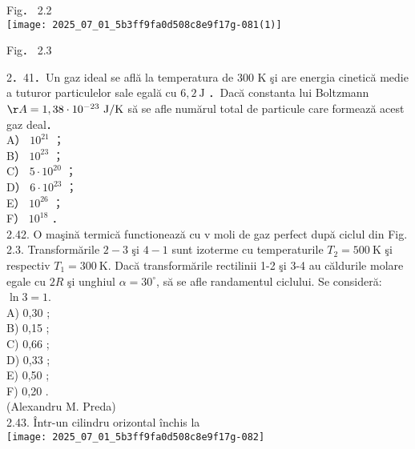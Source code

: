 Fig． 2.2\\
\texttt{[image: 2025\_07\_01\_5b3ff9fa0d508c8e9f17g-081(1)]}

Fig． 2.3

2．41．Un gaz ideal se află la temperatura de 300 K şi are energia cinetică medie a tuturor particulelor sale egală cu $6,2 \mathrm{~J}$ ．Dacă constanta lui Boltzmann $\AA=1,38 \cdot 10^{-23} \mathrm{~J} / \mathrm{K}$ să se afle numărul total de particule care formează acest gaz deal．\\
A） $10^{21}$ ；\\
B） $10^{23}$ ；\\
C） $5 \cdot 10^{20}$ ；\\
D） $6 \cdot 10^{23}$ ；\\
E） $10^{26}$ ；\\
F） $10^{18}$ ．\\
2.42. O maşină termică functionează cu v moli de gaz perfect după ciclul din Fig. 2.3. Transformările $2-3$ şi $4-1$ sunt izoterme cu temperaturile $T_{2}=500 \mathrm{~K}$ şi respectiv $T_{1}=300 \mathrm{~K}$. Dacă transformările rectilinii 1-2 şi 3-4 au căldurile molare egale cu $2 R$ şi unghiul $\alpha=30^{\circ}$, să se afle randamentul ciclului. Se consideră: $\ln 3=1$.\\
A) 0,30 ;\\
B) 0,15 ;\\
C) 0,66 ;\\
D) 0,33 ;\\
E) 0,50 ;\\
F) 0,20 .\\
(Alexandru M. Preda)\\
2.43. Într-un cilindru orizontal închis la\\
\texttt{[image: 2025\_07\_01\_5b3ff9fa0d508c8e9f17g-082]}

